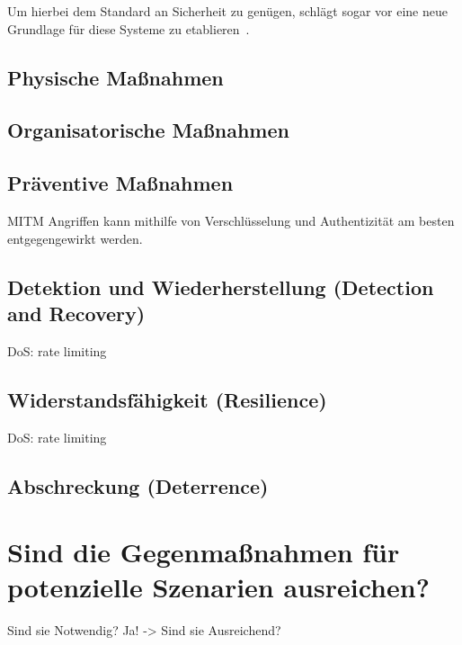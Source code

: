 \documentclass[final,bibliography=totocnumbered]{include/sikseminar}
\begin{document}
Um hierbei dem Standard an Sicherheit zu genügen, schlägt \citeauthor{Lee08} sogar vor eine neue Grundlage für diese Systeme zu etablieren~\cite{Lee08}.

\subsection{Physische Maßnahmen}\label{subsec:physisch}

\subsection{Organisatorische Maßnahmen}\label{subsec:orga}

\subsection{Präventive Maßnahmen}\label{subsec:präventiv}

MITM Angriffen kann mithilfe von Verschlüsselung und Authentizität am besten entgegengewirkt werden.

\subsection{Detektion und Wiederherstellung (Detection and Recovery)}\label{subsec:detektion}
DoS: rate limiting

\subsection{Widerstandsfähigkeit (Resilience)}\label{subsec:widerstand} %

DoS: rate limiting

\subsection{Abschreckung (Deterrence)}\label{subsec:abschreckung} %

\section{Sind die Gegenmaßnahmen für potenzielle Szenarien ausreichen?}\label{sec:diskussion}

Sind sie Notwendig?
Ja! -> Sind sie Ausreichend?


\newpage
\printglossary[type=\acronymtype]
~\nocite{*}

\printbibliography
\newpage
\end{document}
